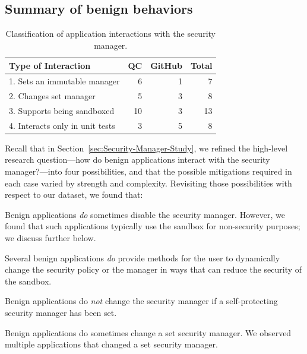 \documentclass{sig-alternate}
\begin{document}
\subsection{Summary of benign behaviors}\label{sub:Evaluation-of-the-hypotheses}


\begin{table}
\caption{Classification of application
  interactions \label{tab:Classification-of-Application}
with the security manager.}
\begin{tabular}{lrrr}
\toprule 
Type of Interaction & QC & GitHub & Total\tabularnewline
\midrule
1. Sets an immutable manager & 6 & 1 & 7\tabularnewline
2. Changes set manager & 5 & 3 & 8\tabularnewline
3. Supports being sandboxed & 10 & 3 & 13\tabularnewline
4. Interacts only in unit tests & 3 & 5 & 8\tabularnewline
\bottomrule
\end{tabular}
\end{table}


Recall that in Section~\ref{sec:Security-Manager-Study}, we refined the
high-level research question---how do benign applications interact with the
security manager?---into four possibilities, and that the possible mitigations
required in each case varied by strength and complexity.  Revisiting those
possibilities with respect to our dataset, we found that:
\begin{flushenum}\setlength{\parskip}{0pt}
  \setlength{\parsep}{0pt}
  \setlength{\itemsep}{0pt}
\item Benign applications \emph{do} sometimes disable the security manager.
  However, we found that such applications typically use the sandbox for
  non-security purposes; we discuss further below.

\item Several benign applications \emph{do} provide methods for the user to
  dynamically change the security policy or the manager in ways that can reduce
  the security of the sandbox.

\item Benign applications do \emph{not} change the
security manager if a self-protecting security manager has been set.  

\item Benign applications do sometimes change a set security manager.  We
  observed multiple applications that changed a set security manager.
\end{flushenum}
\end{document}
